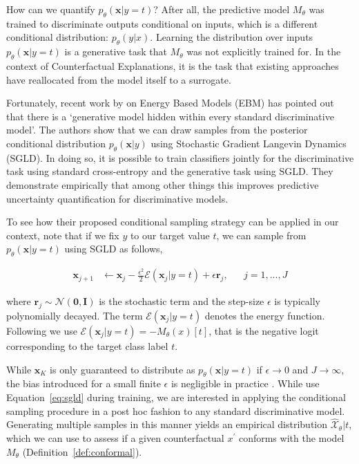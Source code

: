 \documentclass{article}
\begin{document}
How can we quantify $p_{\theta}(\mathbf{x}|y=t)$? After all, the predictive model $M_{\theta}$ was trained to discriminate outputs conditional on inputs, which is a different conditional distribution: $p_{\theta}(y|x)$. Learning the distribution over inputs $p_{\theta}(\mathbf{x}|y=t)$ is a generative task that $M_{\theta}$ was not explicitly trained for. In the context of Counterfactual Explanations, it is the task that existing approaches have reallocated from the model itself to a surrogate. 

Fortunately, recent work by \citet{grathwohl2020your} on Energy Based Models (EBM) has pointed out that there is a `generative model hidden within every standard discriminative model'. The authors show that we can draw samples from the posterior conditional distribution $p_{\theta}(\mathbf{x}|y)$ using Stochastic Gradient Langevin Dynamics (SGLD). In doing so, it is possible to train classifiers jointly for the discriminative task using standard cross-entropy and the generative task using SGLD. They demonstrate empirically that among other things this improves predictive uncertainty quantification for discriminative models. 

To see how their proposed conditional sampling strategy can be applied in our context, note that if we fix $y$ to our target value $t$, we can sample from $p_{\theta}(\mathbf{x}|y=t)$ using SGLD as follows, 

\begin{equation}\label{eq:sgld}
  \begin{aligned}
    \mathbf{x}_{j+1} &\leftarrow \mathbf{x}_j - \frac{\epsilon^2}{2} \mathcal{E}(\mathbf{x}_j|y=t) + \epsilon \mathbf{r}_j, && j=1,...,J
  \end{aligned}
\end{equation}

where $\mathbf{r}_j \sim \mathcal{N}(\mathbf{0},\mathbf{I})$ is the stochastic term and the step-size $\epsilon$ is typically polynomially decayed. The term $\mathcal{E}(\mathbf{x}_j|y=t)$ denotes the energy function. Following \citet{grathwohl2020your} we use $\mathcal{E}(\mathbf{x}_j|y=t)=-M_{\theta}(x)[t]$, that is the negative logit corresponding to the target class label $t$.

While $\mathbf{x}_K$ is only guaranteed to distribute as $p_{\theta}(\mathbf{x}|y=t)$ if $\epsilon \rightarrow 0$ and $J \rightarrow \infty$, the bias introduced for a small finite $\epsilon$ is negligible in practice \citep{murphy2023probabilistic,grathwohl2020your}. While \citet{grathwohl2020your} use Equation~\ref{eq:sgld} during training, we are interested in applying the conditional sampling procedure in a post hoc fashion to any standard discriminative model. Generating multiple samples in this manner yields an empirical distribution $\hat{\mathcal{X}}_{\theta}|t$, which we can use to assess if a given counterfactual $x^{\prime}$ conforms with the model $M_{\theta}$ (Definition~\ref{def:conformal}). 
\end{document}
